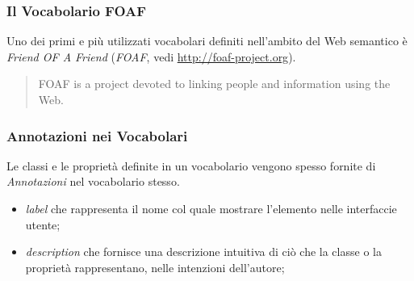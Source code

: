 \documentclass[8pt]{beamer}
\begin{document}
\begin{frame}
  \frametitle{Il Vocabolario FOAF}
  Uno dei primi e pi\`u utilizzati vocabolari definiti nell'ambito
  del Web semantico \`e \emph{Friend OF A Friend} (\emph{FOAF}, vedi \url{http://foaf-project.org}).
  \vspace{\baselineskip}

  \begin{quote}
  FOAF is a project devoted to linking people and information using the Web. 
  \end{quote}
  \vspace{\baselineskip}


  
\end{frame}

\begin{frame}
\frametitle{Annotazioni nei Vocabolari}
Le classi e le propriet\`a definite in un vocabolario vengono spesso fornite
di \emph{Annotazioni} nel vocabolario stesso.
\begin{itemize}[<+->]
 \item \emph{label} che rappresenta il nome col quale mostrare l'elemento nelle interfaccie utente;
 \item \emph{description} che fornisce una descrizione intuitiva di ci\`o che la classe o la propriet\`a
 rappresentano, nelle intenzioni dell'autore;
\end{itemize}

\end{frame}
\end{document}
